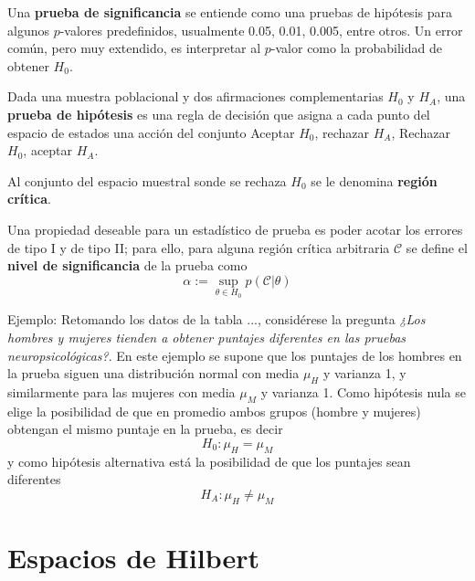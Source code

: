 Una \textbf{prueba de significancia} se entiende como una pruebas de hipótesis para algunos $p$-valores predefinidos, usualmente 0.05, 0.01, 0.005, entre otros.
%
Un error común, pero muy extendido, es interpretar al $p$-valor como la probabilidad de obtener $H_0$.

\begin{definicion}
Dada una muestra poblacional y dos afirmaciones complementarias $H_0$ y $H_A$, una \textbf{prueba de hipótesis} es una regla de decisión que asigna a cada punto del espacio de estados una acción del conjunto Aceptar $H_0$, rechazar $H_A$, Rechazar $H_0$, aceptar $H_A$.

Al conjunto del espacio muestral sonde se rechaza $H_0$ se le denomina \textbf{región crítica}. 
\end{definicion}

Una propiedad deseable para un estadístico de prueba es poder acotar los errores de tipo I y de tipo II; para ello, para alguna región crítica arbitraria $\mathcal{C}$ se define el \textbf{nivel de significancia} de la prueba como
\begin{equation}
\alpha := \sup_{\theta \in H_0} p(\mathcal{C} \lvert \theta)
\end{equation}

Ejemplo:
Retomando los datos de la tabla ..., considérese la pregunta \textit{¿Los hombres y mujeres tienden
a obtener puntajes diferentes en las pruebas neuropsicológicas?}. 
%
En este ejemplo se supone que los puntajes de los hombres en la prueba siguen una distribución normal con media $\mu_H$ y varianza 1, y similarmente para las mujeres con media $\mu_M$ y varianza 1.
%
Como hipótesis nula se elige la posibilidad de que en promedio ambos grupos (hombre y mujeres) obtengan el mismo puntaje en la prueba, es decir
\begin{equation}
H_0 : \mu_H = \mu_M
\end{equation}
y como hipótesis alternativa está la posibilidad de que los puntajes sean diferentes
\begin{equation}
H_A : \mu_H \neq \mu_M
\end{equation}


\section{Espacios de Hilbert}

